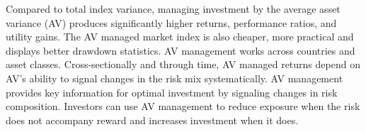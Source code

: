 \begin{doublespace}


\noindent Compared to total index variance, managing investment by the average asset variance (AV) produces significantly higher returns, performance ratios, and utility gains. The AV managed market index is also cheaper, more practical and displays better drawdown statistics. AV management works across countries and asset classes. Cross-sectionally and through time, AV managed returns depend on AV's ability to signal changes in the risk mix systematically.  AV management provides key information for optimal investment by signaling changes in risk composition. Investors can use AV management to reduce exposure when the risk does not accompany reward and increases investment when it does.



\end{doublespace}
